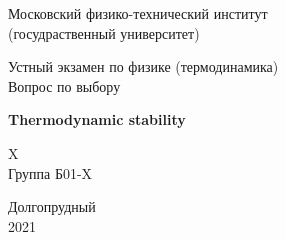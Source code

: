 \documentclass[a4paper,14pt]{article} %
\begin{document}


\begin{titlepage}

	\newpage
	\begin{center}
		\normalsize Московский физико-технический институт \\(госудраственный 			университет)
	\end{center}

	\vspace{6em}

	\begin{center}
		\Large Устный экзамен по физике (термодинамика)\\Вопрос по выбору
	\end{center}

	\vspace{1em}

	\begin{center}
		\large \textbf{Thermodynamic stability}
	\end{center}

	\vspace{2em}

	\begin{center}
		\large X\\
		Группа Б01-X
	\end{center}

	\vspace{\fill}

	\begin{center}
	Долгопрудный \\2021
	\end{center}
	
\end{titlepage}



\thispagestyle{empty}
\newpage
\tableofcontents
\newpage
\setcounter{page}{1}


\end{document}
